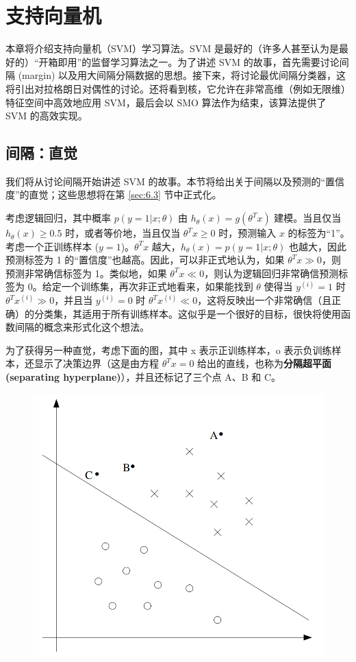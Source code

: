 \chapter{支持向量机}

本章将介绍支持向量机（SVM）学习算法。SVM 是最好的（许多人甚至认为是最好的）“开箱即用”的监督学习算法之一。为了讲述 SVM 的故事，首先需要讨论间隔 (margin) 以及用大间隔分隔数据的思想。接下来，将讨论最优间隔分类器，这将引出对拉格朗日对偶性的讨论。还将看到核，它允许在非常高维（例如无限维）特征空间中高效地应用 SVM，最后会以 SMO 算法作为结束，该算法提供了 SVM 的高效实现。

\section{间隔：直觉}

我们将从讨论间隔开始讲述 SVM 的故事。本节将给出关于间隔以及预测的“置信度”的直觉；这些思想将在第 \ref{sec:6.3} 节中正式化。

考虑逻辑回归，其中概率 $p(y=1|x; \theta)$ 由 $h_\theta(x) = g(\theta^T x)$ 建模。当且仅当 $h_\theta(x) \ge 0.5$ 时，或者等价地，当且仅当 $\theta^T x \ge 0$ 时，预测输入 $x$ 的标签为“1”。考虑一个正训练样本 ($y=1$)。$\theta^T x$ 越大，$h_\theta(x) = p(y=1|x; \theta)$ 也越大，因此预测标签为 1 的“置信度”也越高。因此，可以非正式地认为，如果 $\theta^T x \gg 0$，则预测非常确信标签为 1。类似地，如果 $\theta^T x \ll 0$，则认为逻辑回归非常确信预测标签为 0。给定一个训练集，再次非正式地看来，如果能找到 $\theta$ 使得当 $y^{(i)}=1$ 时 $\theta^T x^{(i)} \gg 0$，并且当 $y^{(i)}=0$ 时 $\theta^T x^{(i)} \ll 0$，这将反映出一个非常确信（且正确）的分类集，其适用于所有训练样本。这似乎是一个很好的目标，很快将使用函数间隔的概念来形式化这个想法。

为了获得另一种直觉，考虑下面的图，其中 x 表示正训练样本，o 表示负训练样本，还显示了决策边界（这是由方程 $\theta^T x = 0$ 给出的直线，也称为\textbf{分隔超平面 (separating hyperplane)}），并且还标记了三个点 A、B 和 C。

\begin{figure}[H]
    \centering
    \includegraphics[width=0.5\linewidth]{figs/svm_hyperplane.png}
\end{figure}

